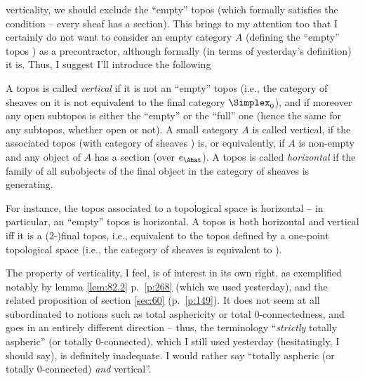 verticality, we should exclude the ``empty'' topos (which formally
satisfies the condition -- every sheaf has a section). This brings to
my attention too that I certainly do not want to consider an empty
category $A$ (defining the ``empty'' topos \Ahat) as a precontractor,
although formally (in terms of yesterday's definition) it is. Thus, I
suggest I'll introduce the following
\begin{definition}
  A topos is called \emph{vertical} if it is not an ``empty'' topos
  (i.e., the category of sheaves on it is not equivalent to the final
  category $\Simplex_0$), and if moreover any open subtopos is either
  the ``empty'' or the ``full'' one (hence the same for any subtopos,
  whether open or not). A small category $A$ is called vertical, if
  the associated topos (with category of sheaves \Ahat)
  is, or equivalently, if $A$ is non-empty and any object
  of $A$ has a section (over $e_\Ahat$). A topos is called
  \emph{horizontal} if the family of all subobjects of the final
  object in the category of sheaves \scrA{} is generating.
\end{definition}

For instance, the topos associated to a topological space is
horizontal -- in particular, an ``empty'' topos is horizontal. A topos
is both horizontal and vertical if{f} it is a ($2$-)final topos, i.e.,
equivalent to the topos defined by a one-point topological space
(i.e., the category of sheaves is equivalent to \Sets).

The property of verticality, I feel, is of interest in its own right,
as exemplified notably by lemma \ref{lem:82.2} p.\ \ref{p:268} (which
we used yesterday), and the related proposition of section
\ref{sec:60} (p.\ \ref{p:149}). It does not seem at all subordinated
to notions such as total asphericity or total $0$-connectedness, and
goes in an entirely different direction -- thus, the terminology
``\emph{strictly} totally aspheric'' (or totally $0$-connected), which
I still used yesterday (hesitatingly, I should say), is definitely
inadequate. I would rather say ``totally aspheric (or totally
$0$-connected) \emph{and} vertical''.

